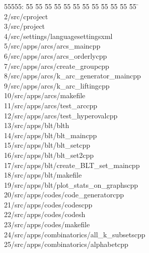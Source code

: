 %
%
\begin{tabbing}
55555: \= 55 \= 55 \= 55 \= 55 \= 55 \= 55 \= 55 \= 55 \= 55 \= 55 \= 55 \= 55 \= \>\\[0pt]
2\>/src/cproject\\[0pt]
3\>/src/project\\[0pt]
4\>/src/settings/languagesettingsxml\\[0pt]
5\>/src/apps/arcs/arcs\_maincpp\\[0pt]
6\>/src/apps/arcs/arcs\_orderlycpp\\[0pt]
7\>/src/apps/arcs/create\_groupcpp\\[0pt]
8\>/src/apps/arcs/k\_arc\_generator\_maincpp\\[0pt]
9\>/src/apps/arcs/k\_arc\_liftingcpp\\[0pt]
10\>/src/apps/arcs/makefile\\[0pt]
11\>/src/apps/arcs/test\_arccpp\\[0pt]
12\>/src/apps/arcs/test\_hyperovalcpp\\[0pt]
13\>/src/apps/blt/blth\\[0pt]
14\>/src/apps/blt/blt\_maincpp\\[0pt]
15\>/src/apps/blt/blt\_setcpp\\[0pt]
16\>/src/apps/blt/blt\_set2cpp\\[0pt]
17\>/src/apps/blt/create\_BLT\_set\_maincpp\\[0pt]
18\>/src/apps/blt/makefile\\[0pt]
19\>/src/apps/blt/plot\_stats\_on\_graphscpp\\[0pt]
20\>/src/apps/codes/code\_generatorcpp\\[0pt]
21\>/src/apps/codes/codescpp\\[0pt]
22\>/src/apps/codes/codesh\\[0pt]
23\>/src/apps/codes/makefile\\[0pt]
24\>/src/apps/combinatorics/all\_k\_subsetscpp\\[0pt]
25\>/src/apps/combinatorics/alphabetcpp\\[0pt]

\end{tabbing}
